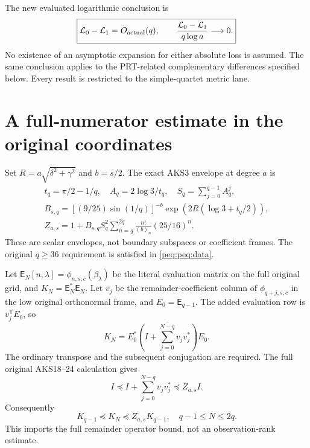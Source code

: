 \documentclass[11pt,a4paper]{article}
\begin{document}
The new evaluated logarithmic conclusion is
\begin{equation}
 \boxed{\mathcal L_0-\mathcal L_1=O_{\rm actual}(q),\qquad
 \frac{\mathcal L_0-\mathcal L_1}{q\log a}\longrightarrow0.}
 \label{peq:peq:main}
\end{equation}
No existence of an asymptotic expansion for either absolute loss is assumed. The same conclusion applies to the PRT-related complementary differences specified below. Every result is restricted to the simple-quartet metric lane.

\section{A full-numerator estimate in the original coordinates}
Set $R=a\sqrt{\delta^2+\gamma^2}$ and $b=s/2$. The exact AKS3 envelope at degree $a$ is
\begin{equation}
\begin{gathered}
 t_q=\pi/2-1/q,\quad A_q=2\log3/t_q,\quad
 S_q=\sum_{j=0}^{q-1}A_q^j,\\
 B_{s,q}=[(9/25)\sin(1/q)]^{-b}
              \exp(2R(\log3+t_q/2)),\\
 Z_{a,s}=1+B_{s,q}S_q^2\sum_{n=q}^{2q}
                \frac{n!}{(b)_n}(25/16)^n.
\end{gathered}\label{peq:peq:Z}
\end{equation}
These are scalar envelopes, not boundary subspaces or coefficient frames. The original $q\ge36$ requirement is satisfied in \eqref{peq:peq:data}.

Let $\mathsf E_N[n,\lambda]=\phi_{n,s,c}(\beta_\lambda)$ be the literal evaluation matrix on the full original grid, and $K_N=\mathsf E_N^*\mathsf E_N$. Let $v_j$ be the remainder-coefficient column of $\phi_{q+j,s,c}$ in the low original orthonormal frame, and $E_0=\mathsf E_{q-1}$. The added evaluation row is $v_j^{\mathsf T}E_0$, so
\begin{equation}
 K_N=E_0^*\overline{\left(I+\sum_{j=0}^{N-q}v_jv_j^*\right)}E_0.
 \label{peq:peq:numgram}
\end{equation}
The ordinary transpose and the subsequent conjugation are required. The full original AKS18--24 calculation gives
\[
 I\preceq I+\sum_{j=0}^{N-q}v_jv_j^*\preceq Z_{a,s}I.
\]
Consequently
\begin{equation}
 \boxed{K_{q-1}\preceq K_N\preceq Z_{a,s}K_{q-1},
                  \quad q-1\le N\le2q.}\label{peq:peq:num-bound}
\end{equation}
This imports the full remainder operator bound, not an observation-rank estimate.
\end{document}
